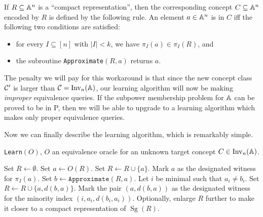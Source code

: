 \documentclass[letterpaper,11pt]{article}
\DeclareMathOperator{\Inv}{Inv}
\DeclareMathOperator{\Sg}{Sg}
\begin{document}
\begin{defn} If $R \subseteq \mathbb{A}^n$ is a ``compact representation'', then the corresponding concept $C \subseteq \mathbb{A}^n$ encoded by $R$ is defined by the following rule. An element $a \in \mathbb{A}^n$ is in $C$ iff the following two conditions are satisfied:
\begin{itemize}
\item for every $I \subseteq [n]$ with $|I| < k$, we have $\pi_I(a) \in \pi_I(R)$, and

\item the subroutine \texttt{Approximate}$(R,a)$ returns $a$.
\end{itemize}
\end{defn}

The penalty we will pay for this workaround is that since the new concept class $\mathcal{C}'$ is larger than $\cC = \Inv_n(\bA)$, our learning algorithm will now be making \emph{improper} equivalence queries. If the subpower membership problem for $\mathbb{A}$ can be proved to be in P, then we will be able to upgrade to a learning algorithm which makes only proper equivalence queries.

Now we can finally describe the learning algorithm, which is remarkably simple.

\begin{algorithm}
\caption{\texttt{Learn}$(O)$, $O$ an equivalence oracle for an unknown target concept $C \in \Inv_n(\bA)$.}
\begin{algorithmic}[1]
\State Set $R \gets \emptyset$.
\State Set $a \gets O(R)$.
\State Set $R \gets R\cup\{a\}$.
\State Mark $a$ as the designated witness for $\pi_I(a)$.
\EndFor
{}
\State Set $b \gets \texttt{Approximate}(R,a)$.
\State Let $i$ be minimal such that $a_i \ne b_i$.
\State Set $R \gets R\cup\{a,d(b,a)\}$.
\State Mark the pair $(a,d(b,a))$ as the designated witness for the minority index $(i,a_i,d(b_i,a_i))$.
\EndWhile
\State Optionally, enlarge $R$ further to make it closer to a compact representation of $\Sg(R)$.
\EndWhile
\end{algorithmic}
\end{algorithm}
\end{document}
